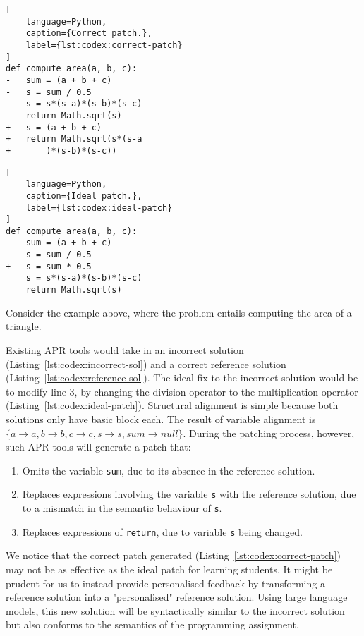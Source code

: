 \begin{multicols}{2}
\begin{lstlisting}[
    language=Python,
    caption={Correct patch.},
    label={lst:codex:correct-patch}
]
def compute_area(a, b, c):
-   sum = (a + b + c)
-   s = sum / 0.5
-   s = s*(s-a)*(s-b)*(s-c)
-   return Math.sqrt(s)
+   s = (a + b + c)
+   return Math.sqrt(s*(s-a
+       )*(s-b)*(s-c))
\end{lstlisting}

\columnbreak

\begin{lstlisting}[
    language=Python,
    caption={Ideal patch.},
    label={lst:codex:ideal-patch}
]
def compute_area(a, b, c):
    sum = (a + b + c)
-   s = sum / 0.5
+   s = sum * 0.5
    s = s*(s-a)*(s-b)*(s-c)
    return Math.sqrt(s)
\end{lstlisting}
\end{multicols}

Consider the example above, where the problem entails computing the area of a triangle.

Existing APR tools would take in an incorrect solution (Listing~\ref{lst:codex:incorrect-sol})
and a correct reference solution (Listing~\ref{lst:codex:reference-sol}).
The ideal fix to the incorrect solution would be to modify line 3, by changing the division
operator to the multiplication operator (Listing~\ref{lst:codex:ideal-patch}).
Structural alignment is simple because both solutions only have basic block each.
The result of variable alignment is $\{a \rightarrow a, b \rightarrow b, c \rightarrow c,
s \rightarrow s, sum \rightarrow null\}$.
During the patching process, however, such APR tools will generate a patch that:
\begin{enumerate}
    \item Omits the variable \texttt{sum}, due to its absence in the reference solution.
    \item Replaces expressions involving the variable \texttt{s} with the reference
          solution, due to a mismatch in the semantic behaviour of \texttt{s}.
    \item Replaces expressions of \texttt{return}, due to variable \texttt{s} being
          changed.
\end{enumerate}

We notice that the correct patch generated (Listing~\ref{lst:codex:correct-patch}) may
not be as effective as the ideal patch for learning students.
It might be prudent for us to instead provide personalised feedback by transforming a
reference solution into a "personalised" reference solution.
Using large language models, this new solution will be syntactically similar to the
incorrect solution but also conforms to the semantics of the programming assignment.

